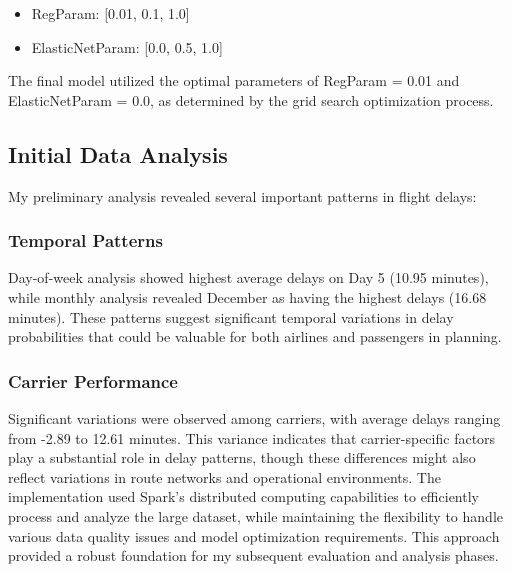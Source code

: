 \begin{itemize}
\item RegParam: [0.01, 0.1, 1.0]
\item ElasticNetParam: [0.0, 0.5, 1.0]
\end{itemize}

The final model utilized the optimal parameters of RegParam = 0.01 and ElasticNetParam = 0.0, as determined by the grid search optimization process.

\subsection{Initial Data Analysis}
My preliminary analysis revealed several important patterns in flight delays:

\subsubsection{Temporal Patterns}
Day-of-week analysis showed highest average delays on Day 5 (10.95 minutes), while monthly analysis revealed December as having the highest delays (16.68 minutes). These patterns suggest significant temporal variations in delay probabilities that could be valuable for both airlines and passengers in planning.

\subsubsection{Carrier Performance}
Significant variations were observed among carriers, with average delays ranging from -2.89 to 12.61 minutes. This variance indicates that carrier-specific factors play a substantial role in delay patterns, though these differences might also reflect variations in route networks and operational environments.
The implementation used Spark's distributed computing capabilities to efficiently process and analyze the large dataset, while maintaining the flexibility to handle various data quality issues and model optimization requirements. 
This approach provided a robust foundation for my subsequent evaluation and analysis phases.
